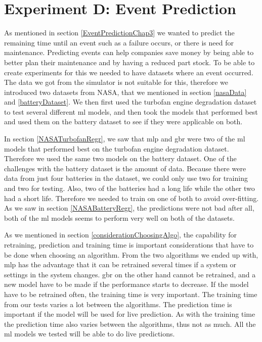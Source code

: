 \documentclass[english, a4paper]{report}
\begin{document}
{    \section{Experiment D: Event Prediction}
    {
        As mentioned in section \ref{EventPredictionChap3} we wanted to predict the remaining time until an event such as a failure occurs, or there is need for maintenance. Predicting events can help companies save money by being able to better plan their maintenance and by having a reduced part stock. To be able to create experiments for this we needed to have datasets where an event occurred. The data we got from the simulator is not suitable for this, therefore we introduced two datasets from NASA, that we mentioned in section \ref{nasaData} and \ref{batteryDataset}. We then first used the turbofan engine degradation dataset to test several different \gls{ml} models, and then took the models that performed best and used them on the battery dataset to see if they were applicable on both.
        \par 
        In section \ref{NASATurbofanRegr}, we saw that \gls{mlp} and \gls{gbr} were two of the \gls{ml} models that performed best on the turbofan engine degradation dataset. Therefore we used the same two models on the battery dataset. One of the challenges with the battery dataset is the amount of data. Because there were data from just four batteries in the dataset, we could only use two for training and two for testing. Also, two of the batteries had a long life while the other two had a short life. Therefore we needed to train on one of both to avoid over-fitting. As we saw in section \ref{NASABatteryRegr}, the predictions were not bad after all, both of the \gls{ml} models seems to perform very well on both of the datasets. 
        \par 
        As we mentioned in section \ref{considerationChoosingAlgo}, the capability for retraining, prediction and training time is important considerations that have to be done when choosing an algorithm. From the two algorithms we ended up with, \gls{mlp} has the advantage that it can be retrained several times if a system or settings in the system changes. \Gls{gbr} on the other hand cannot be retrained, and a new model have to be made if the performance starts to decrease. If the model have to be retrained often, the training time is very important. The training time from our tests varies a lot between the algorithms. The prediction time is important if the model will be used for live prediction. As with the training time the prediction time also varies between the algorithms, thus not as much. All the \gls{ml} models we tested will be able to do live predictions. 
}}
\end{document}
